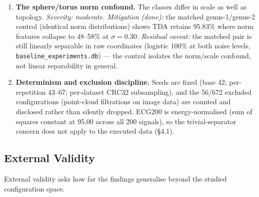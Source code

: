 \begin{enumerate}
  \item \textbf{The sphere/torus norm confound.} The classes differ in scale
    as well as topology. \emph{Severity: moderate.} \emph{Mitigation (done):}
    the matched genus-1/genus-2 control (identical norm distributions) shows
    TDA retains 95.83\% where norm features collapse to 48--58\% at
    $\sigma{=}0.30$. \emph{Residual caveat:} the matched pair is still
    linearly separable in raw coordinates (logistic 100\% at both noise
    levels, \texttt{baseline\_experiments.db}) --- the control isolates the
    norm/scale confound, not linear separability in general.
  \item \textbf{Determinism and exclusion discipline.} Seeds are fixed (base
    42; per-repetition 43--67; per-dataset CRC32 subsampling), and the
    56/672 excluded configurations (point-cloud filtrations on image data)
    are counted and disclosed rather than silently dropped. ECG200 is
    energy-normalised (sum of squares constant at 95.00 across all 200
    signals), so the trivial-separator concern does not apply to the executed
    data (\S4.1).
\end{enumerate}

\subsection{External Validity}
\label{sec:threats_external}

External validity asks how far the findings generalise beyond the studied
configuration space.

